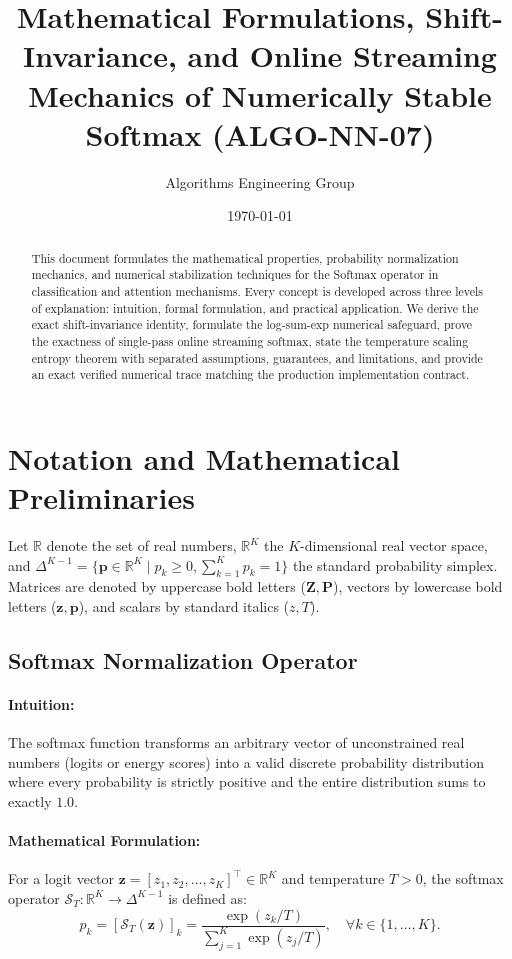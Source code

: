 \documentclass[11pt]{article}
\title{Mathematical Formulations, Shift-Invariance, and Online Streaming Mechanics of Numerically Stable Softmax (ALGO-NN-07)}
\author{Algorithms Engineering Group}
\date{\today}
\begin{document}
\maketitle

\begin{abstract}
This document formulates the mathematical properties, probability normalization mechanics, and numerical stabilization techniques for the Softmax operator in classification and attention mechanisms. Every concept is developed across three levels of explanation: intuition, formal formulation, and practical application. We derive the exact shift-invariance identity, formulate the log-sum-exp numerical safeguard, prove the exactness of single-pass online streaming softmax, state the temperature scaling entropy theorem with separated assumptions, guarantees, and limitations, and provide an exact verified numerical trace matching the production implementation contract.
\end{abstract}

\section{Notation and Mathematical Preliminaries}
\label{sec:notation}

Let $\mathbb{R}$ denote the set of real numbers, $\mathbb{R}^K$ the $K$-dimensional real vector space, and $\Delta^{K-1} = \{\mathbf{p} \in \mathbb{R}^K \mid p_k \ge 0, \sum_{k=1}^K p_k = 1\}$ the standard probability simplex. Matrices are denoted by uppercase bold letters ($\mathbf{Z}, \mathbf{P}$), vectors by lowercase bold letters ($\mathbf{z}, \mathbf{p}$), and scalars by standard italics ($z, T$).

\subsection{Softmax Normalization Operator}
\paragraph{Intuition:} The softmax function transforms an arbitrary vector of unconstrained real numbers (logits or energy scores) into a valid discrete probability distribution where every probability is strictly positive and the entire distribution sums to exactly $1.0$.

\paragraph{Mathematical Formulation:}
For a logit vector $\mathbf{z} = [z_1, z_2, \dots, z_K]^\top \in \mathbb{R}^K$ and temperature $T > 0$, the softmax operator $\mathcal{S}_T: \mathbb{R}^K \to \Delta^{K-1}$ is defined as:
\begin{equation}
\label{eq:softmax_def}
p_k = [\mathcal{S}_T(\mathbf{z})]_k = \frac{\exp(z_k / T)}{\sum_{j=1}^K \exp(z_j / T)}, \quad \forall k \in \{1, \dots, K\}.
\end{equation}
\end{document}
